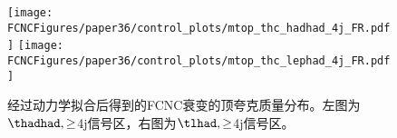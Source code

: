 
\begin{figure}[H]
\centering
\texttt{[image: \\FCNCFigures/paper36/control\_plots/mtop\_thc\_hadhad\_4j\_FR.pdf]}
\texttt{[image: \\FCNCFigures/paper36/control\_plots/mtop\_thc\_lephad\_4j\_FR.pdf]}
\caption{经过动力学拟合后得到的FCNC衰变的顶夸克质量分布。左图为$\thadhad,\ge$4j信号区，右图为$\tlhad,\ge$4j信号区。}
\label{fig:topmass36}
\end{figure}